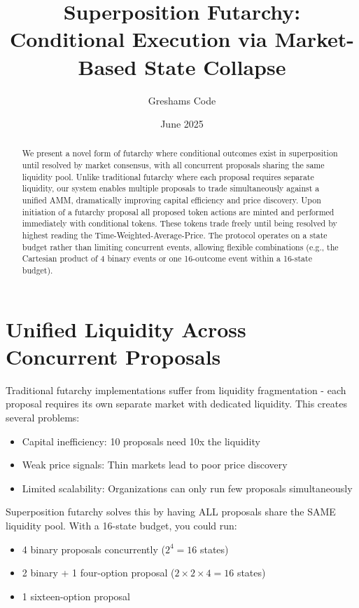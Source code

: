 \documentclass{article}
\title{Superposition Futarchy: Conditional Execution via Market-Based State Collapse}
\author[1]{Greshams Code}
\affil[1]{Founder, \href{https://govex.ai}{Govex.ai}}
\date{June 2025}
\begin{document}
\maketitle

\begin{abstract}
    We present a novel form of futarchy where conditional outcomes exist in superposition until resolved by market consensus, with all concurrent 
    proposals sharing the same liquidity pool. Unlike traditional futarchy 
    where each proposal requires separate liquidity, our system enables 
    multiple proposals to trade simultaneously against a unified AMM, 
    dramatically improving capital efficiency and price discovery. Upon initiation of a futarchy proposal all proposed token actions are minted and performed immediately with conditional tokens. These tokens trade freely until being resolved by highest reading the Time-Weighted-Average-Price.
    The protocol operates on a state budget rather than limiting concurrent events, allowing flexible combinations (e.g., the Cartesian product of 4 binary events or one 16-outcome event within a 16-state budget).
    \end{abstract}
    
\section{Unified Liquidity Across Concurrent Proposals}

Traditional futarchy implementations suffer from liquidity fragmentation - 
each proposal requires its own separate market with dedicated liquidity. 
This creates several problems:
\begin{itemize}
    \item Capital inefficiency: 10 proposals need 10x the liquidity
    \item Weak price signals: Thin markets lead to poor price discovery  
    \item Limited scalability: Organizations can only run few proposals simultaneously
\end{itemize}

Superposition futarchy solves this by having ALL proposals share the SAME 
liquidity pool. With a 16-state budget, you could run:
\begin{itemize}
    \item 4 binary proposals concurrently ($2^4 = 16$ states)
    \item 2 binary + 1 four-option proposal ($2 \times 2 \times 4 = 16$ states)
    \item 1 sixteen-option proposal
\end{itemize}
\end{document}
